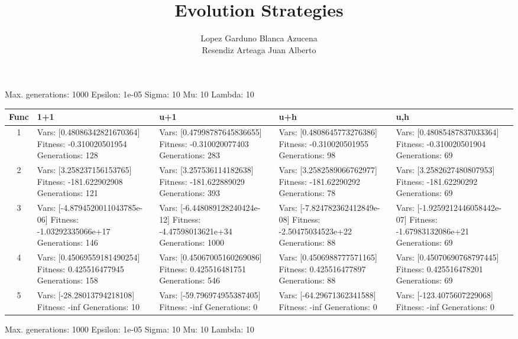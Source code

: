 \documentclass[landscape,11pt]{article}
\begin{document}
\title{Evolution Strategies}
 \author{Lopez Garduno Blanca Azucena\\ Resendiz Arteaga Juan Alberto}
 \maketitle
Max. generations: 1000 Epsilon: 1e-05 Sigma: 10 Mu: 10 Lambda: 10 \\
\begin{tabular}{|c|p{5.4cm}|p{5.4cm}|p{5.4cm}|p{5.4cm}|}
 \hline
 Func & 1+1 & u+1 & u+h & u,h \\ 
 \hline
 1 & Vars: [0.48086342821670364] Fitness: -0.310020501954 Generations: 128 & Vars: [0.47998787645836655] Fitness: -0.310020077403 Generations: 283 & Vars: [0.4808645773276386] Fitness: -0.310020501955 Generations: 98 & Vars: [0.48085487837033364] Fitness: -0.310020501904 Generations: 69 \\
 \hline 
 2 & Vars: [3.258237156153765] Fitness: -181.622902908 Generations: 121 & Vars: [3.257536114182638] Fitness: -181.622889029 Generations: 393 & Vars: [3.2582589066762977] Fitness: -181.62290292 Generations: 78 & Vars: [3.2582627480807953] Fitness: -181.62290292 Generations: 69 \\
 \hline 
 3 & Vars: [-4.8794520011043785e-06] Fitness: -1.03292335066e+17 Generations: 146 & Vars: [-6.448089128240424e-12] Fitness: -4.47598013621e+34 Generations: 1000 & Vars: [-7.824782362412849e-08] Fitness: -2.50475034523e+22 Generations: 88 & Vars: [-1.9259212446058442e-07] Fitness: -1.67983132086e+21 Generations: 69 \\
 \hline 
 4 & Vars: [0.45069559181490254] Fitness: 0.425516477945 Generations: 158 & Vars: [0.45067005160269086] Fitness: 0.425516481751 Generations: 546 & Vars: [0.4506988777571165] Fitness: 0.425516477897 Generations: 88 & Vars: [0.45070690768797445] Fitness: 0.425516478201 Generations: 69 \\
 \hline 
 5 & Vars: [-28.28013794218108] Fitness: -inf Generations: 10 & Vars: [-59.796974955387405] Fitness: -inf Generations: 0 & Vars: [-64.29671362341588] Fitness: -inf Generations: 0 & Vars: [-123.4075607229068] Fitness: -inf Generations: 0 \\
 \hline 
\end{tabular}
\newpage
Max. generations: 1000 Epsilon: 1e-05 Sigma: 10 Mu: 10 Lambda: 10 \\
\end{document}
